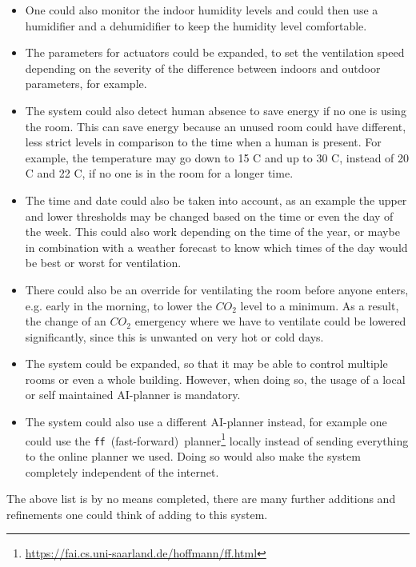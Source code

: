\begin{itemize}
    \item One could also monitor the indoor humidity levels and could then use a humidifier and a dehumidifier to keep the humidity level comfortable.

    \item The parameters for actuators could be expanded, to set the ventilation speed depending on the severity of the difference between indoors and outdoor parameters, for example.

    \item The system could also detect human absence to save energy if no one is using the room.
    This can save energy because an unused room could have different, less strict levels in comparison to the time when a human is present.
    For example, the temperature may go down to 15 \textdegree C and up to 30 \textdegree C, instead of 20 \textdegree C and 22 \textdegree C, if no one is in the room for a longer time.

    \item The time and date could also be taken into account, as an example the upper and lower thresholds may be changed based on the time or even the day of the week.
    This could also work depending on the time of the year, or maybe in combination with a weather forecast to know which times of the day would be best or worst for ventilation.

    \item There could also be an override for ventilating the room before anyone enters, e.g. early in the morning, to lower the $CO_2$ level to a minimum.
    As a result, the change of an $CO_2$ emergency where we have to ventilate could be lowered significantly, since this is unwanted on very hot or cold days.

    \item The system could be expanded, so that it may be able to control multiple rooms or even a whole building.
    However, when doing so, the usage of a local or self maintained AI-planner is mandatory.

    \item The system could also use a different AI-planner instead, for example one could use the \texttt{ff}~(fast-forward)~planner\footnote{\url{https://fai.cs.uni-saarland.de/hoffmann/ff.html}} locally instead of sending everything to the online planner we used.
    Doing so would also make the system completely independent of the internet.
\end{itemize}

The above list is by no means completed, there are many further additions and refinements one could think of adding to this system.
